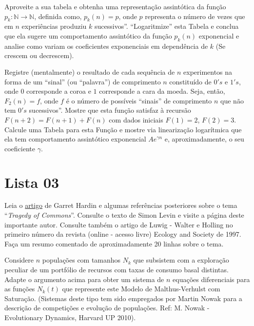 \begin{exercise}
Aproveite a sua tabela e obtenha uma representação assintótica da função \(p_k: \mathbb{N} \to \mathbb{N}\), definida como, \(p_k(n) = p\), onde \(p\) representa o número de vezes que em \(n\) experiências produziu \(k\) sucessivos''. ``Logaritmize'' esta Tabela e conclua que ela sugere um comportamento assintótico da função \(p_k(n)\) exponencial e analise como variam os coeficientes exponenciais em dependência de \(k\) (Se crescem ou decrescem).
\end{exercise}

\begin{exercise}
Registre (mentalmente) o resultado de cada sequência de \(n\) experimentos na forma de um ``sinal'' (ou ``palavra'') de comprimento \(n\) constituído de \(0's\) e \(1's\), onde \(0\) corresponde a coroa e \(1\) corresponde a cara da moeda. Seja, então, \(F_2(n) = f\), onde \(f\) é o número de possíveis ``sinais'' de comprimento \(n\) que não tem \(0's\) sucessivos''. Mostre que esta função satisfaz à recursão \(F(n+2) = F(n+1) + F(n)\) com dados iniciais \(F(1) = 2\), \(F(2) = 3\). Calcule uma Tabela para esta Função e mostre via linearização logarítmica que ela tem comportamento assintótico exponencial \(Ae^{\gamma n}\) e, aproximadamente, o seu coeficiente \(\gamma\).
\end{exercise}


\section*{Lista 03}

\begin{exercise}
Leia o \href{https://www.hendrix.edu/uploadedFiles/Admission/GarrettHardinArticle.pdf}{artigo} de Garret Hardin  e algumas referências posteriores sobre o tema ``\textit{Tragedy of Commons}''. Consulte o texto de Simon Levin e visite a página deste importante autor. Consulte também o artigo de Luwig - Walter e Holling no primeiro número da revista (online - acesso livre) Ecology and Society de 1997. Faça um resumo comentado de aproximadamente 20 linhas sobre o tema.
\end{exercise}


\begin{exercise}
Considere \(n\) populações com tamanhos \(N_k\) que subsistem com a exploração peculiar de um portfólio de recursos com taxas de consumo basal distintas. Adapte o argumento acima para obter um sistema de \(n\) equações diferenciais para as funções \(N_k(t)\) que represente este Modelo de Malthus-Verhulst com Saturação. (Sistemas deste tipo tem sido empregados por Martin Nowak para a descrição de competições e evolução de populações. Ref: M. Nowak - Evolutionary Dynamics, Harvard UP 2010).
\end{exercise}

